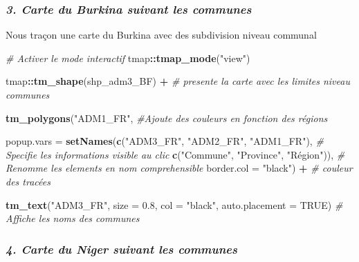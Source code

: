 \documentclass[
]{article}
\newenvironment{Shaded}{\begin{snugshade}}{\end{snugshade}}
\newcommand{\AttributeTok}[1]{\textcolor[rgb]{0.13,0.29,0.53}{#1}}
\newcommand{\CommentTok}[1]{\textcolor[rgb]{0.56,0.35,0.01}{\textit{#1}}}
\newcommand{\ConstantTok}[1]{\textcolor[rgb]{0.56,0.35,0.01}{#1}}
\newcommand{\FloatTok}[1]{\textcolor[rgb]{0.00,0.00,0.81}{#1}}
\newcommand{\FunctionTok}[1]{\textcolor[rgb]{0.13,0.29,0.53}{\textbf{#1}}}
\newcommand{\NormalTok}[1]{#1}
\newcommand{\SpecialCharTok}[1]{\textcolor[rgb]{0.81,0.36,0.00}{\textbf{#1}}}
\newcommand{\StringTok}[1]{\textcolor[rgb]{0.31,0.60,0.02}{#1}}
\begin{document}
\subsubsection{\texorpdfstring{\emph{3. Carte du Burkina suivant les
communes}}{3. Carte du Burkina suivant les communes}}\label{carte-du-burkina-suivant-les-communes}

Nous traçon une carte du Burkina avec des subdivision niveau communal

\begin{Shaded}
\begin{Highlighting}[]
\CommentTok{\# Activer le mode interactif}
\NormalTok{tmap}\SpecialCharTok{::}\FunctionTok{tmap\_mode}\NormalTok{(}\StringTok{"view"}\NormalTok{)}

\NormalTok{tmap}\SpecialCharTok{::}\FunctionTok{tm\_shape}\NormalTok{(shp\_adm3\_BF) }\SpecialCharTok{+} \CommentTok{\# presente la carte avec les limites niveau communes}
  
  \FunctionTok{tm\_polygons}\NormalTok{(}\StringTok{"ADM1\_FR"}\NormalTok{, }\CommentTok{\#Ajoute des couleurs en fonction des régions}
              
             \AttributeTok{popup.vars =} \FunctionTok{setNames}\NormalTok{(}\FunctionTok{c}\NormalTok{(}\StringTok{"ADM3\_FR"}\NormalTok{, }\StringTok{"ADM2\_FR"}\NormalTok{, }\StringTok{"ADM1\_FR"}\NormalTok{), }\CommentTok{\# Specifie les informations visible au clic }
                                    \FunctionTok{c}\NormalTok{(}\StringTok{"Commune"}\NormalTok{, }\StringTok{"Province"}\NormalTok{, }\StringTok{"Région"}\NormalTok{)), }\CommentTok{\# Renomme les elements en nom comprehensible}
              \AttributeTok{border.col =} \StringTok{"black"}\NormalTok{) }\SpecialCharTok{+} \CommentTok{\# couleur des tracées}
  
  \FunctionTok{tm\_text}\NormalTok{(}\StringTok{"ADM3\_FR"}\NormalTok{, }\AttributeTok{size =} \FloatTok{0.8}\NormalTok{, }\AttributeTok{col =} \StringTok{"black"}\NormalTok{, }\AttributeTok{auto.placement =} \ConstantTok{TRUE}\NormalTok{)   }\CommentTok{\# Affiche les noms des communes}
\end{Highlighting}
\end{Shaded}

\subsubsection{\texorpdfstring{\emph{4. Carte du Niger suivant les
communes}}{4. Carte du Niger suivant les communes}}\label{carte-du-niger-suivant-les-communes}
\end{document}
